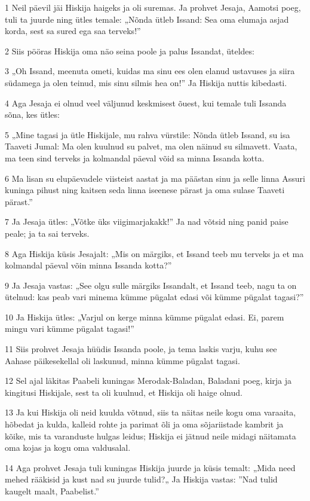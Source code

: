 \par 1 Neil päevil jäi Hiskija haigeks ja oli suremas. Ja prohvet Jesaja, Aamotsi poeg, tuli ta juurde ning ütles temale: „Nõnda ütleb Issand: Sea oma elumaja asjad korda, sest sa sured ega saa terveks!”
\par 2 Siis pööras Hiskija oma näo seina poole ja palus Issandat, üteldes:
\par 3 „Oh Issand, meenuta ometi, kuidas ma sinu ees olen elanud ustavuses ja siira südamega ja olen teinud, mis sinu silmis hea on!” Ja Hiskija nuttis kibedasti.
\par 4 Aga Jesaja ei olnud veel väljunud keskmisest õuest, kui temale tuli Issanda sõna, kes ütles:
\par 5 „Mine tagasi ja ütle Hiskijale, mu rahva vürstile: Nõnda ütleb Issand, su isa Taaveti Jumal: Ma olen kuulnud su palvet, ma olen näinud su silmavett. Vaata, ma teen sind terveks ja kolmandal päeval võid sa minna Issanda kotta.
\par 6 Ma lisan su elupäevadele viisteist aastat ja ma päästan sinu ja selle linna Assuri kuninga pihust ning kaitsen seda linna iseenese pärast ja oma sulase Taaveti pärast.”
\par 7 Ja Jesaja ütles: „Võtke üks viigimarjakakk!” Ja nad võtsid ning panid paise peale; ja ta sai terveks.
\par 8 Aga Hiskija küsis Jesajalt: „Mis on märgiks, et Issand teeb mu terveks ja et ma kolmandal päeval võin minna Issanda kotta?”
\par 9 Ja Jesaja vastas: „See olgu sulle märgiks Issandalt, et Issand teeb, nagu ta on ütelnud: kas peab vari minema kümme pügalat edasi või kümme pügalat tagasi?”
\par 10 Ja Hiskija ütles: „Varjul on kerge minna kümme pügalat edasi. Ei, parem mingu vari kümme pügalat tagasi!”
\par 11 Siis prohvet Jesaja hüüdis Issanda poole, ja tema laskis varju, kuhu see Aahase päikesekellal oli laskunud, minna kümme pügalat tagasi.
\par 12 Sel ajal läkitas Paabeli kuningas Merodak-Baladan, Baladani poeg, kirja ja kingitusi Hiskijale, sest ta oli kuulnud, et Hiskija oli haige olnud.
\par 13 Ja kui Hiskija oli neid kuulda võtnud, siis ta näitas neile kogu oma varaaita, hõbedat ja kulda, kalleid rohte ja parimat õli ja oma sõjariistade kambrit ja kõike, mis ta varanduste hulgas leidus; Hiskija ei jätnud neile midagi näitamata oma kojas ja kogu oma valdusalal.
\par 14 Aga prohvet Jesaja tuli kuningas Hiskija juurde ja küsis temalt: „Mida need mehed rääkisid ja kust nad su juurde tulid?„ Ja Hiskija vastas: ”Nad tulid kaugelt maalt, Paabelist.”
